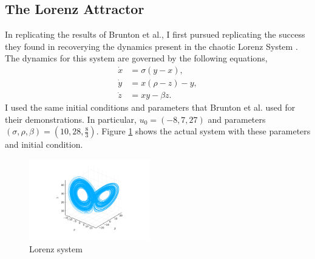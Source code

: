\documentclass[10pt]{paper}
\begin{document}
\subsection{The Lorenz Attractor} \label{sec:lorenz_results}
In replicating the results of Brunton et al., I first pursued replicating the success they found in recoverying the dynamics present in the chaotic Lorenz System \cite{sindy}\cite{lorenz1963deterministic}. 
The dynamics for this system are governed by the following equations, 
\begin{equation}\label{eq:lorenz}
\begin{split}
	\dot x &= \sigma(y - x), \\
	\dot y &= x(\rho - z) - y, \\
	\dot z &= xy - \beta z.
\end{split}
\end{equation}
I used the same initial conditions and parameters that Brunton et al. \cite{sindy} used for their demonstrations. In particular, $u_0 = (-8, 7, 27)$ and parameters $(\sigma, \rho, \beta) = \left( 10, 28, \frac 83 \right)$. 
Figure \ref{fig:lorenz_system_actual} shows the actual system with these parameters and initial condition. 

\begin{figure}[h]
	\caption{Lorenz system}
	\label{fig:lorenz_system_actual}

	\centering
	\includegraphics[width = 0.47\textwidth, trim={4.3cm, 1.6cm, 4.3cm, 2.5cm}, clip]{lorenz_attractor.pdf}
\end{figure}
\end{document}
